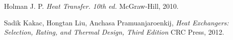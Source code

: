 \documentclass{article}
\begin{document}
\begin{thebibliography}{9}

    Holman J. P.
    \emph{Heat Transfer. 10th ed.}
    McGraw-Hill,
    2010.

    Sadik Kakac, Hongtan Liu, Anchasa Pramuanjaroenkij,
    \emph{Heat Exchangers: Selection, Rating, and Thermal Design, Third Edition}
    CRC Press,
    2012.


\end{thebibliography}
\end{document}
